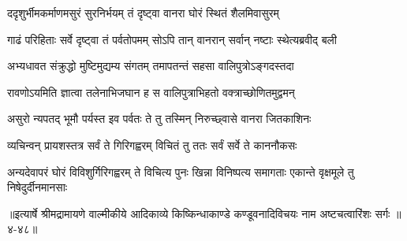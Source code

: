\twolineshloka
{ददृशुर्भीमकर्माणमसुरं सुरनिर्भयम्}
{तं दृष्ट्वा वानरा घोरं स्थितं शैलमिवासुरम्} %

\twolineshloka
{गाढं परिहिताः सर्वे दृष्ट्वा तं पर्वतोपमम्}
{सोऽपि तान् वानरान् सर्वान् नष्टाः स्थेत्यब्रवीद् बली} %

\twolineshloka
{अभ्यधावत संक्रुद्धो मुष्टिमुद्यम्य संगतम्}
{तमापतन्तं सहसा वालिपुत्रोऽङ्गदस्तदा} %

\twolineshloka
{रावणोऽयमिति ज्ञात्वा तलेनाभिजघान ह}
{स वालिपुत्राभिहतो वक्त्राच्छोणितमुद्वमन्} %

\twolineshloka
{असुरो न्यपतद् भूमौ पर्यस्त इव पर्वतः}
{ते तु तस्मिन् निरुच्छ्वासे वानरा जितकाशिनः} %

\twolineshloka
{व्यचिन्वन् प्रायशस्तत्र सर्वं ते गिरिगह्वरम्}
{विचितं तु ततः सर्वं सर्वे ते काननौकसः} %

\threelineshloka
{अन्यदेवापरं घोरं विविशुर्गिरिगह्वरम्}
{ते विचित्य पुनः खिन्ना विनिष्पत्य समागताः}
{एकान्ते वृक्षमूले तु निषेदुर्दीनमानसाः} %


॥इत्यार्षे श्रीमद्रामायणे वाल्मीकीये आदिकाव्ये किष्किन्धाकाण्डे कण्डूवनादिविचयः नाम अष्टचत्वारिंशः सर्गः ॥४-४८॥
